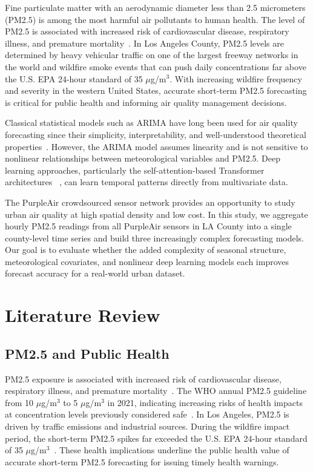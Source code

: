 \documentclass[conference]{IEEEtran}
\begin{document}
Fine particulate matter with an aerodynamic diameter less than 2.5 micrometers (PM2.5) is among the most harmful air pollutants to human health. The level of PM2.5 is associated with increased risk of cardiovascular disease, respiratory illness, and premature mortality~\cite{pope2002}. In Los Angeles County, PM2.5 levels are determined by heavy vehicular traffic on one of the largest freeway networks in the world and wildfire smoke events that can push daily concentrations far above the U.S. EPA 24-hour standard of 35 $\mu$g/m$^3$. With increasing wildfire frequency and severity in the western United States, accurate short-term PM2.5 forecasting is critical for  public health and informing air quality management decisions.

Classical statistical models such as ARIMA have long been used for air quality forecasting since their simplicity, interpretability, and well-understood theoretical properties~\cite{box2015}. However, the ARIMA model assumes linearity and is not sensitive to nonlinear relationships between meteorological variables and PM2.5. Deep learning approaches, particularly the self-attention-based Transformer architectures ~\cite{vaswani2017},  can learn temporal patterns directly from multivariate data.

The PurpleAir crowdsourced sensor network provides an opportunity to study urban air quality at high spatial density and low cost. In this study, we aggregate hourly PM2.5 readings from all PurpleAir sensors in LA County into a single county-level time series and build three increasingly complex forecasting models. Our goal is to evaluate whether the added complexity of seasonal structure, meteorological covariates, and nonlinear deep learning models each improves forecast accuracy for a real-world urban dataset.

\section{Literature Review}

\subsection{PM2.5 and Public Health}
PM2.5 exposure is associated with increased risk of cardiovascular disease, respiratory illness, and premature mortality~\cite{pope2002}. The WHO annual PM2.5 guideline from 10 $\mu$g/m$^3$ to 5 $\mu$g/m$^3$ in 2021, indicating increasing risks of health impacts at concentration levels previously considered safe~\cite{who2021}. In Los Angeles, PM2.5 is driven by traffic emissions and industrial sources. During the wildfire impact period,  the short-term PM2.5 spikes far exceeded the U.S. EPA 24-hour standard of 35 $\mu$g/m$^3$~\cite{epa2024}. These health implications underline the public health value of accurate short-term PM2.5 forecasting for issuing timely health warnings.
\end{document}
